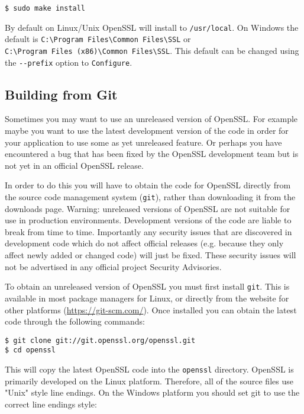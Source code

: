\begin{verbatim}
$ sudo make install
\end{verbatim}

By default on Linux/Unix OpenSSL will install to \verb!/usr/local!. On
Windows the default is \verb!C:\Program Files\Common Files\SSL! or \\
\verb!C:\Program Files (x86)\Common Files\SSL!. This default can be changed
using the \verb!--prefix! option to \verb!Configure!.

\subsection{Building from Git}

Sometimes you may want to use an unreleased version of OpenSSL. For example
maybe you want to use the latest development version of the code in order for your
application to use some as yet unreleased feature. Or perhaps you have
encountered a bug that has been fixed by the OpenSSL development team but is not
yet in an official OpenSSL release.

In order to do this you will have to obtain the code for OpenSSL directly from
the source code management system (\verb!git!), rather than downloading it from
the downloads page. Warning: unreleased versions of OpenSSL are not suitable for
use in production environments. Development versions of the code are liable to
break from time to time. Importantly any security issues that are discovered in
development code which do not affect official releases (e.g. because they only
affect newly added or changed code) will just be fixed. These security issues
will not be advertised in any official project Security Advisories.

To obtain an unreleased version of OpenSSL you must first install \verb!git!.
This is available in most package managers for Linux, or directly from the
website for other platforms (\url{https://git-scm.com/}). Once installed you
can obtain the latest code through the following commands:

\begin{verbatim}
$ git clone git://git.openssl.org/openssl.git
$ cd openssl
\end{verbatim}

This will copy the latest OpenSSL code into the \verb!openssl! directory.
OpenSSL is primarily developed on the Linux platform. Therefore, all of the
source files use "Unix" style line endings. On the Windows platform you should
set git to use the correct line endings style:

